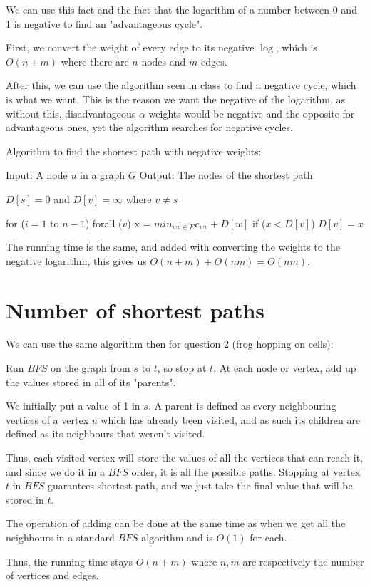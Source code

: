 \documentclass[11pt,letterpaper]{article}
\begin{document}
		We can use this fact and the fact that the logarithm of a number between 0 and 1 is negative to find an "advantageous cycle".
		
		First, we convert the weight of every edge to its negative $\log$, which is $O(n+m)$ where there are $n$ nodes and $m$ edges.
		
		After this, we can use the algorithm seen in class to find a negative cycle, which is what we want. This is the reason we want the negative of the logarithm, as without this, disadvantageous $\alpha$ weights would be negative and the opposite for advantageous ones, yet the algorithm searches for negative cycles.
		\begin{center}
			Algorithm to find the shortest path with negative weights:
		\end{center}
			Input: A node $u$ in a graph $G$\newline
			Output: The nodes of the shortest path
		\begin{algorithm}[caption={}, label={alg1}]
			$D[s] = 0$ and $D[v] = \infty$ where $v \neq s$
			
			for ($i = 1$ to $n-1$)
				forall ($v$)
					x = $min_{wv\in E} c_{wv} +D[w]$
					if ($x < D[v]$)
						$D[v] = x$
		\end{algorithm}
	
		The running time is the same, and added with converting the weights to the negative logarithm, this gives us $O(n+m) + O(nm) = O(nm)$.
	
	\section{Number of shortest paths}
		We can use the same algorithm then for question 2 (frog hopping on cells):
		
		Run $BFS$ on the graph from $s$ to $t$, so stop at $t$.
		At each node or vertex, add up the values stored in all of its "parents".
		
		We initially put a value of 1 in $s$.
		A parent is defined as every neighbouring vertices of a vertex $u$ which has already been visited, and as such its children are defined as its neighbours that weren't visited.
		
		Thus, each visited vertex will store the values of all the vertices that can reach it, and since we do it in a $BFS$ order, it is all the possible paths.
		Stopping at vertex $t$ in $BFS$ guarantees shortest path, and we just take the final value that will be stored in $t$.
		
		The operation of adding can be done at the same time as when we get all the neighbours in a standard $BFS$ algorithm and is $O(1)$ for each.
		
		Thus, the running time stays $O(n + m)$ where $n, m$ are respectively the number of vertices and edges.
	
\end{document}
